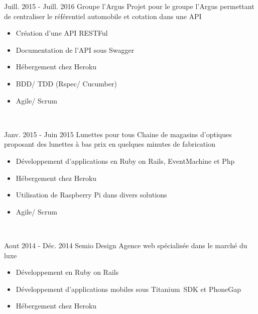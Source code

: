 \documentclass[letterpaper]{twentysecondcv} %
\begin{document}
\begin{twenty}
	\twentyitem
    	{Juill. 2015 - }
		{Juill. 2016}
        {Groupe l'Argus}
        {}
        {Projet pour le groupe l'Argus permettant de centraliser le référentiel automobile et cotation dans une API}
        {
        {\begin{itemize}
        \item Création d'une API RESTFul
        \item Documentation de l'API sous Swagger
        \item Hébergement chez Heroku
        \item BDD/ TDD (Rspec/ Cucumber) 
        \item Agile/ Scrum

    \end{itemize}}
        }
    \\   

\end{twenty}

\begin{twenty}

    \twentyitem
   		{Janv. 2015 - }
		{Juin 2015}
        {Lunettes pour tous}
        {}
        {Chaine de magasins d'optiques proposant des lunettes à bas prix en quelques minutes de fabrication}
        {
        {\begin{itemize}
        \item Développement d'applications en Ruby on Rails, \mbox{EventMachine} et Php
        \item Hébergement chez Heroku
        \item Utilisation de Raspberry Pi dans divers solutions
        \item Agile/ Scrum


    \end{itemize}}
        }
     \\

\end{twenty}

\begin{twenty}

     \twentyitem
   		{Aout 2014 - }
		{Déc. 2014}
        {Semio Design}
        {}
        {Agence web spécialisée dans le marché du luxe}
        {
        \begin{itemize}
        \item Développement en Ruby on Rails
        \item Développement d'applications mobiles sous \mbox{Titanium SDK} et PhoneGap
        \item Hébergement chez Heroku
    \end{itemize}
    	}

\end{twenty}
\end{document}
